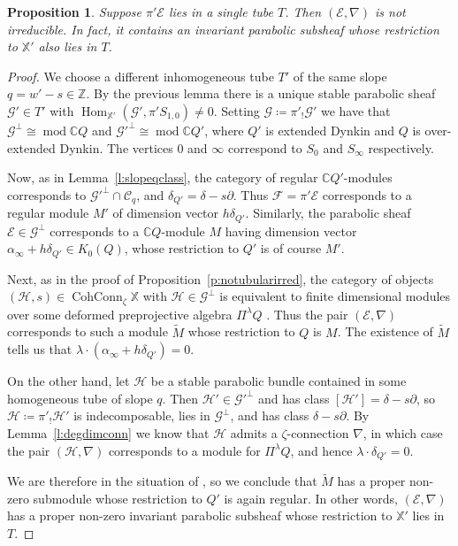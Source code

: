 \documentclass[12pt,a4paper]{amsart}
\theoremstyle{plain}
\newtheorem{prop}[thm]{Proposition}
\newcommand{\C}{\mathbb C}
\newcommand{\Z}{\mathbb Z}
\DeclareMathOperator{\mmod}{mod}
\DeclareMathOperator{\Hom}{Hom}
\DeclareMathOperator{\CohConn}{CohConn}
\newcommand{\F}{\mathcal F}
\newcommand{\E}{\mathcal E}
\newcommand{\G}{\mathcal G}
\newcommand{\CC}{\mathcal C}
\newcommand{\XX}{\mathbb X}
\begin{document}
\begin{prop}
\label{p:exttubular2}
Suppose $\pi'\E$ lies in a single tube $T$. Then $(\E,\nabla)$ is not irreducible. In fact, it contains an invariant parabolic subsheaf whose restriction to $\XX'$ also lies in $T$.
\end{prop}

\begin{proof}
We choose a different inhomogeneous tube $T'$ of the same slope $q=w'-s\in\Z$. By the previous lemma there is a unique stable parabolic sheaf $\G'\in T'$ with $\Hom_{\XX'}(\G',\pi'S_{1,0})\neq0$. Setting $\G\coloneqq\pi'_!\G'$ we have that $\G^\perp\cong\mmod\C Q$ and ${\G'}^\perp\cong\mmod\C Q'$, where $Q'$ is extended Dynkin and $Q$ is over-extended Dynkin. The vertices $0$ and $\infty$ correspond to $S_0$ and $S_\infty$ respectively.

Now, as in Lemma~\ref{l:slopeqclass}, the category of regular $\C Q'$-modules corresponds to ${\G'}^\perp\cap\CC_q$, and $\delta_{Q'}=\delta-s\partial$. Thus $\F=\pi'\E$ corresponds to a regular module $M'$ of dimension vector $h\delta_{Q'}$. Similarly, the parabolic sheaf $\E\in\G^\perp$ corresponds to a $\C Q$-module $M$ having dimension vector $\alpha_\infty+h\delta_{Q'}\in K_0(Q)$, whose restriction to $Q'$ is of course $M'$.

Next, as in the proof of Proposition~\ref{p:notubularirred}, the category of objects $(\mathcal H,s)\in\CohConn_\zeta\XX$ with $\mathcal H\in\G^\perp$ is equivalent to finite dimensional modules over some deformed preprojective algebra $\Pi^\lambda Q$ \cite{CBcw}. Thus the pair $(\E,\nabla)$ corresponds to such a module $\widetilde M$ whose restriction to $Q$ is $M$. The existence of $\widetilde M$ tells us that $\lambda\cdot(\alpha_\infty+h\delta_{Q'})=0$.

On the other hand, let $\mathcal H$ be a stable parabolic bundle contained in some homogeneous tube of slope $q$. Then $\mathcal H'\in{\G'}^\perp$ and has class $[\mathcal H']=\delta-s\partial$, so $\mathcal H\coloneqq\pi'_!\mathcal H'$ is indecomposable, lies in $\G^\perp$, and has class $\delta-s\partial$. By Lemma~\ref{l:degdimconn} we know that $\mathcal H$ admits a $\zeta$-connection $\nabla$, in which case the pair $(\mathcal H,\nabla)$ corresponds to a module for $\Pi^\lambda Q$, and hence $\lambda\cdot\delta_{Q'}=0$.

We are therefore in the situation of \cite[Theorem 8.1]{CBHu}, so we conclude that $\widetilde M$ has a proper non-zero submodule whose restriction to $Q'$ is again regular. In other words, $(\mathcal E,\nabla)$ has a proper non-zero invariant parabolic subsheaf whose restriction to $\XX'$ lies in $T$.
\end{proof}
\end{document}
